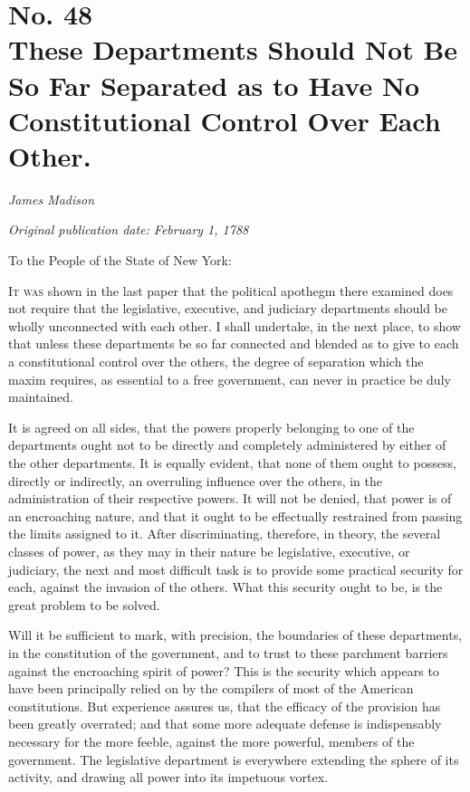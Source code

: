 \chapter[No. 48: These Departments Should Not Be So Far Separated as to Have No Constitutional Control Over Each Other.]{No. 48\\ {\small These Departments Should Not Be So Far Separated as to Have No Constitutional Control Over Each Other.}}

\textit{James Madison}

\textit{Original publication date: February 1, 1788}
\vspace{1cm}

To the People of the State of New York:
\vspace{.4cm}

\textsc{It was} shown in the last paper that the political apothegm there examined does not require that the legislative, executive, and judiciary departments should be wholly unconnected with each other. 
I shall undertake, in the next place, to show that unless these departments be so far connected and blended as to give to each a constitutional control over the others, the degree of separation which the maxim requires, as essential to a free government, can never in practice be duly maintained.

It is agreed on all sides, that the powers properly belonging to one of the departments ought not to be directly and completely administered by either of the other departments. 
It is equally evident, that none of them ought to possess, directly or indirectly, an overruling influence over the others, in the administration of their respective powers. 
It will not be denied, that power is of an encroaching nature, and that it ought to be effectually restrained from passing the limits assigned to it. 
After discriminating, therefore, in theory, the several classes of power, as they may in their nature be legislative, executive, or judiciary, the next and most difficult task is to provide some practical security for each, against the invasion of the others. 
What this security ought to be, is the great problem to be solved.

Will it be sufficient to mark, with precision, the boundaries of these departments, in the constitution of the government, and to trust to these parchment barriers against the encroaching spirit of power? 
This is the security which appears to have been principally relied on by the compilers of most of the American constitutions. 
But experience assures us, that the efficacy of the provision has been greatly overrated; and that some more adequate defense is indispensably necessary for the more feeble, against the more powerful, members of the government. 
The legislative department is everywhere extending the sphere of its activity, and drawing all power into its impetuous vortex.

